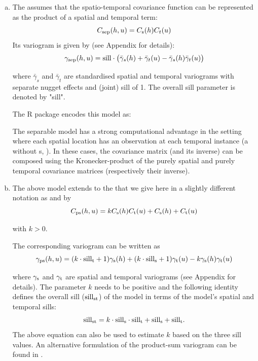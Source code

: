 \begin{enumerate}[a)]
\item The  assumes that the spatio-temporal covariance function can be represented as the product of a spatial and temporal term:
$$C_{\rm sep}(h,u)=C_{\rm s}(h)C_t(u)$$ 
Its variogram is given by (see Appendix for details):
$$\gamma_{\rm sep}(h,u) = {\rm sill} \cdot \big( \bar{\gamma}_s(h)+\bar{\gamma}_t(u)-\bar{\gamma}_s(h)\bar{\gamma}_t(u) \big)$$

where $\bar{\gamma}_s$ and $\bar{\gamma}_t$ are standardised spatial and temporal variograms with separate nugget effects and (joint) sill of 1. The overall sill parameter is denoted by "sill". 

The R package  encodes this model as:


The separable model has a strong computational advantage in the setting where each spatial location has an observation at each temporal instance (a  without s, \cite{Pebesma2012}). In these cases, the covariance matrix (and its inverse) can be composed using the Kronecker-product of the purely spatial and purely temporal covariance matrices (respectively their inverse).

\item 
The above model extends to the  that we give here in a slightly different notation as \citet{DeCesare2001} and \citet{DeIaco2001} by 
$$C_{\rm ps}(h,u)=k C_{\rm s}(h)C_{\rm t}(u) + C_{\rm s}(h) + C_{\rm t}(u)$$

with $k > 0$.

The corresponding variogram can be written as
$$\gamma_{\rm ps}(h,u) = (k \cdot {\rm sill}_{\rm t} + 1) \gamma_{\rm s}(h) + (k \cdot {\rm sill}_{\rm s} + 1) \gamma_{\rm t}(u) - k \gamma_{\rm s}(h) \gamma_{\rm t}(u)$$

where ${\gamma}_{\rm s}$ and $\gamma_{\rm t}$ are spatial and temporal variograms (see Appendix for details). The parameter $k$ needs to be positive and the following identity defines the overall sill (${\rm sill}_{\rm st}$) of the model in terms of the model's spatial and temporal sills:
$${\rm sill}_{\rm st} = k \cdot {\rm sill}_{\rm s} \cdot {\rm sill}_{\rm t} + {\rm sill}_{\rm s} + {\rm sill}_{\rm t}.$$
The above equation can also be used to estimate $k$ based on the three sill values. An alternative formulation of the product-sum variogram can be found in \citet{DeIaco2001}.


\end{enumerate}
